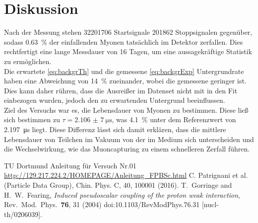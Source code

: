 \section{Diskussion}
Nach der Messung stehen \SI{32201706}{} Startsignale \SI{201862}{} Stoppsignalen gegenüber, sodass \SI{0,63}{\%} der einfallenden Myonen tatsächlich
im Detektor zerfallen. Dies rechtfertigt eine lange Messdauer von 16 Tagen, um eine aussagekräftige Statistik zu ermöglichen. \\
\noindent Die erwartete \eqref{eq:backgrTh} und die gemessene \eqref{eq:backgrExp} Untergrundrate haben eine Abweichung von \SI{14}{\%} zueinander,
wobei die gemessene geringer ist. Dies kann daher rühren, dass die Ausreißer im Datenset nicht mit in den Fit einbezogen wurden, jedoch den zu
erwartenden Untergrund beeinflussen. \\
\noindent Ziel des Versuchs war es, die Lebensdauer von Myonen zu bestimmen. Diese ließ sich bestimmen zu $\tau = \SI{2,106(7)}{\micro\second}$,
was \SI{4,1}{\%} unter dem Referenzwert \cite{pdg} von \SI{2,197}{\micro\second} liegt. Diese Differenz lässt sich damit erklären, dass die mittlere
Lebensdauer von Teilchen im Vakuum von der im Medium sich unterscheiden und die Wechselwirkung, wie das Muoncapturing \cite{mCapture}
zu einem schnelleren Zerfall führen.


\newpage
 \begin{thebibliography}{WissOnl}
 	 TU Dortmund Anleitung für Versuch Nr.01 \url{http://129.217.224.2/HOMEPAGE/Anleitung_FPBSc.html}
 	 C. Patrignani et al. (Particle Data Group), Chin. Phys. C, 40, 100001 (2016).
   	   T.~Gorringe and H.~W.~Fearing,
    \textit{Induced pseudoscalar coupling of the proton weak interaction},
    Rev.\ Mod.\ Phys.\  {\bf 76}, 31 (2004)
    doi:10.1103/RevModPhys.76.31
    [nucl-th/0206039].
	\end{thebibliography}





